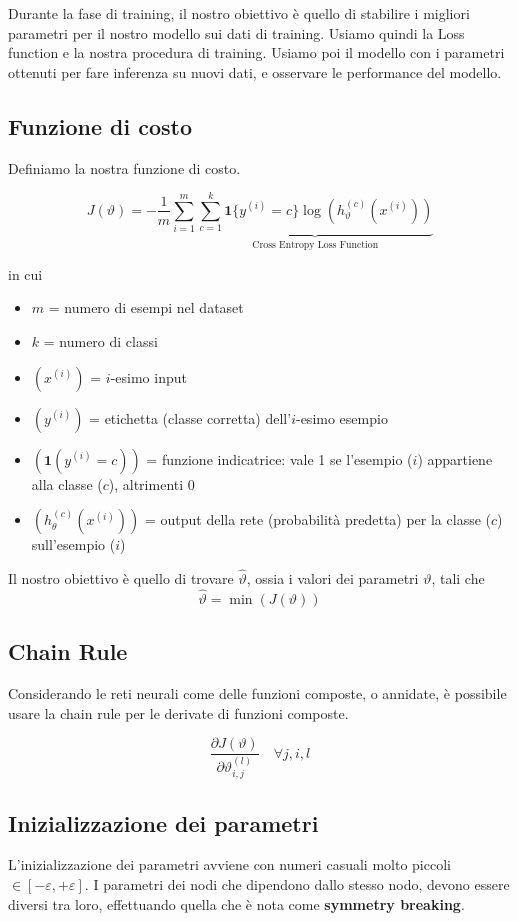 Durante la fase di training, il nostro obiettivo è quello di stabilire i migliori parametri per il nostro modello sui dati di training. Usiamo quindi la Loss function e la nostra procedura di training. Usiamo poi il modello con i parametri ottenuti per fare inferenza su nuovi dati, e osservare le performance del modello.


\subsection{Funzione di costo}
Definiamo la nostra funzione di costo.

$$
J(\vartheta) = -\frac{1}{m} \sum_{i=1}^{m} \underbrace{\sum_{c=1}^{k}\mathbf{1}\{y^{(i)} = c\} \log(h_\vartheta^{(c)}(x^{(i)}))}_\text{Cross Entropy Loss Function}
$$

\noindent 
in cui
\begin{itemize}
	\item $m$ = numero di esempi nel dataset
	\item $k$ = numero di classi
	\item $(x^{(i)})$ = $i$-esimo input
	\item $(y^{(i)})$ = etichetta (classe corretta) dell’$i$-esimo esempio
	\item $(\mathbf{1}(y^{(i)} = c))$ = funzione indicatrice: vale 1 se l’esempio ($i$) appartiene alla classe ($c$), altrimenti 0
	\item $(h_\theta^{(c)}(x^{(i)}))$ = output della rete (probabilità predetta) per la classe ($c$) sull’esempio ($i$)
\end{itemize}

\noindent
Il nostro obiettivo è quello di trovare $\hat{\vartheta}$, ossia i valori dei parametri $\vartheta$, tali che
$$
\hat\vartheta = \min(J(\vartheta))
$$


\subsection{Chain Rule}
Considerando le reti neurali come delle funzioni composte, o annidate, è possibile usare la chain rule per le derivate di funzioni composte.

$$
\frac{\partial J(\vartheta)}{\partial\vartheta_{i,j}^{(l)}} \quad \forall j, i, l
$$ 


\subsection{Inizializzazione dei parametri}
L'inizializzazione dei parametri avviene con numeri casuali molto piccoli $\in [-\varepsilon, +\varepsilon]$. I parametri dei nodi che dipendono dallo stesso nodo, devono essere diversi tra loro, effettuando quella che è nota come \textbf{symmetry breaking}.

